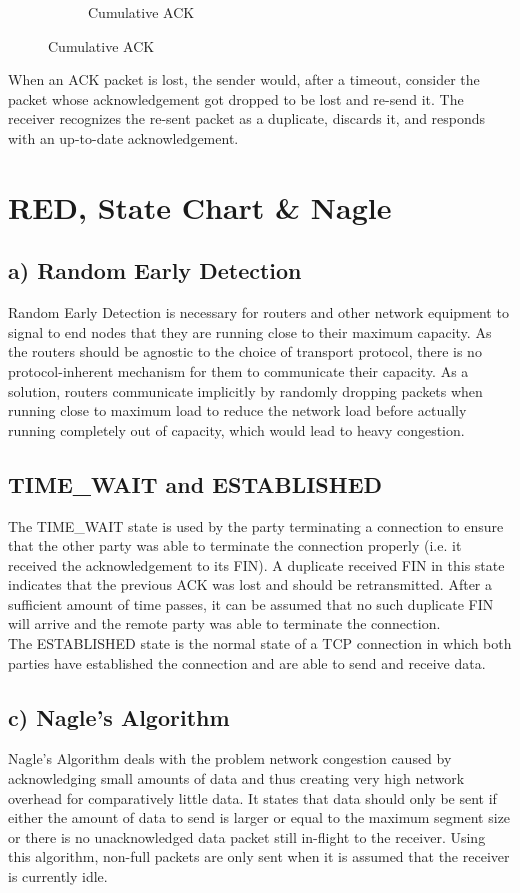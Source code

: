 \documentclass[a4paper, 11 pt, article, accentcolor=tud7b]{tudreport}
\begin{document}
\begin{figure}[h]
\begin{subfigure}[b]{0.3\textwidth}
      \caption{Cumulative ACK}
      \label{fig:2}
    \end{subfigure}
  \end{figure}
	When an ACK packet is lost, the sender would, after a timeout, consider the packet whose acknowledgement got dropped to be lost and re-send it. The receiver recognizes the re-sent packet as a duplicate, discards it, and responds with an up-to-date acknowledgement.
	
	\FloatBarrier
	
	\section{RED, State Chart \& Nagle}
	
	\subsection*{a) Random Early Detection}
	Random Early Detection is necessary for routers and other network equipment to signal to end nodes that they are running close to their maximum capacity. As the routers should be agnostic to the choice of transport protocol, there is no protocol-inherent mechanism for them to communicate their capacity. As a solution, routers communicate implicitly by randomly dropping packets when running close to maximum load to reduce the network load before actually running completely out of capacity, which would lead to heavy congestion.
	
	\subsection*{TIME\_WAIT and ESTABLISHED}
	The TIME\_WAIT state is used by the party terminating a connection to ensure that the other party was able to terminate the connection properly (i.e. it received the acknowledgement to its FIN). A duplicate received FIN in this state indicates that the previous ACK was lost and should be retransmitted. After a sufficient amount of time passes, it can be assumed that no such duplicate FIN will arrive and the remote party was able to terminate the connection. \\ \medskip
	The ESTABLISHED state is the normal state of a TCP connection in which both parties have established the connection and are able to send and receive data.
	
	\subsection*{c) Nagle's Algorithm}
	Nagle's Algorithm deals with the problem network congestion caused by acknowledging small amounts of data and thus creating very high network overhead for comparatively little data. It states that data should only be sent if either the amount of data to send is larger or equal to the maximum segment size or there is no unacknowledged data packet still in-flight to the receiver. Using this algorithm, non-full packets are only sent when it is assumed that the receiver is currently idle.
	
	
\end{document}
